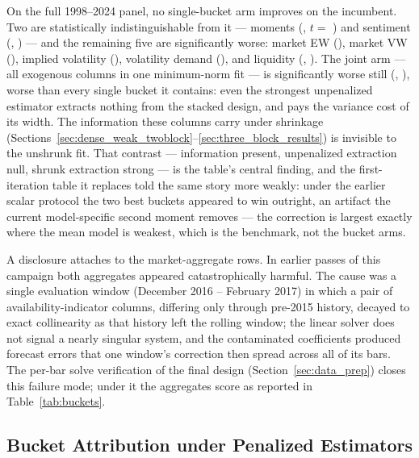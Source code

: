 On the full 1998--2024 panel, no single-bucket arm improves on the
incumbent. Two are statistically indistinguishable from it --- moments
(\unifMomentsDelta{}, $t = $ \unifMomentsDM{}) and sentiment
(\unifSentimentDelta{}, \unifSentimentDM{}) --- and the remaining five
are significantly worse: market EW (\unifMarketEwDM{}), market VW
(\unifMarketVwDM{}), implied volatility (\unifImpliedVolDM{}),
volatility demand (\unifVolDemandDM{}), and liquidity
(\unifLiquidityDelta{}, \unifLiquidityDM{}). The joint arm --- all
exogenous columns in one minimum-norm fit --- is significantly worse
still (\unifAllFeaturesDelta{}, \unifAllFeaturesDM{}), worse than every
single bucket it contains: even the strongest unpenalized estimator
extracts nothing from the stacked design, and pays the variance cost of
its width. The information these columns carry under shrinkage
(Sections~\ref{sec:dense_weak_twoblock}--\ref{sec:three_block_results})
is invisible to the unshrunk fit. That contrast --- information present,
unpenalized extraction null, shrunk extraction strong --- is the table's
central finding, and the first-iteration table it replaces told the same
story more weakly: under the earlier scalar protocol the two best
buckets appeared to win outright, an artifact the current model-specific
second moment removes --- the correction is largest exactly where the
mean model is weakest, which is the benchmark, not the bucket arms.

A disclosure attaches to the market-aggregate rows. In earlier passes of
this campaign both aggregates appeared catastrophically harmful. The cause
was a single evaluation window (December 2016 -- February 2017) in which a
pair of availability-indicator columns, differing only through pre-2015
history, decayed to exact collinearity as that history left the rolling
window; the linear solver does not signal a nearly singular system, and the
contaminated coefficients produced forecast errors that one window's
correction then spread across all of its bars. The per-bar solve
verification of the final design (Section~\ref{sec:data_prep}) closes this
failure mode; under it the aggregates score as reported in
Table~\ref{tab:buckets}.

\subsection{Bucket Attribution under Penalized Estimators}
\label{sec:buckets_tuned}



